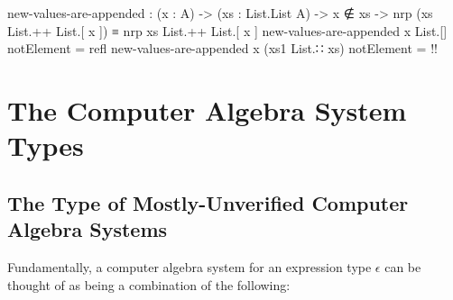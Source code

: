 \documentclass{report}
\begin{document}
\begin{code}
  new-values-are-appended :
    (x : A) ->
    (xs : List.List A) ->
    x ∉ xs ->
    nrp (xs List.++ List.[ x ]) ≡ nrp xs List.++ List.[ x ]
  new-values-are-appended x List.[] notElement = refl
  new-values-are-appended x (xs1 List.∷ xs) notElement = {!!}
\end{code}

\chapter{The Computer Algebra System Types}

\section{The Type of Mostly-Unverified Computer Algebra Systems}
Fundamentally, a computer algebra system for an expression type \(\epsilon\) can be thought of as being a combination of the following:
\end{document}
